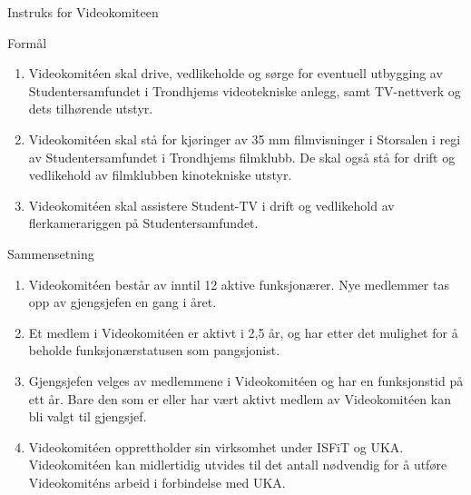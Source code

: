 \begin{instruks*}{Instruks for Videokomiteen}
    
    \begin{instruksledd}{Formål}
        \begin{enumerate}
            \item Videokomit\'een skal drive, vedlikeholde og sørge for eventuell
                utbygging av Studentersamfundet i
                Trondhjems videotekniske anlegg, samt TV-nettverk og dets tilhørende utstyr.
            \item Videokomit\'een skal stå for kjøringer av 35 mm filmvisninger i
                Storsalen i regi av Studentersamfundet i
                Trondhjems filmklubb. De skal også stå for drift og vedlikehold av filmklubben
                kinotekniske utstyr.
            \item Videokomit\'een skal assistere Student-TV i drift og vedlikehold av
                flerkamerariggen på Studentersamfundet.
        \end{enumerate}
    \end{instruksledd}

    \begin{instruksledd}{Sammensetning}
        \begin{enumerate}
            \item Videokomit\'een består av inntil 12 aktive funksjonærer. Nye medlemmer tas opp av
            gjengsjefen en gang i året.
            \item  Et medlem i Videokomit\'een er aktivt i 2,5 år, og har etter det mulighet for å
            beholde funksjonærstatusen som pangsjonist.
            \item Gjengsjefen velges av medlemmene i Videokomit\'een og har en funksjonstid på ett
            år. Bare den som er eller
            har vært aktivt medlem av Videokomit\'een kan bli valgt til gjengsjef.
            \item Videokomit\'een opprettholder sin virksomhet under ISFiT og UKA.
                Videokomit\'een kan midlertidig utvides
            til det antall nødvendig for å utføre Videokomit\'ens arbeid i forbindelse med UKA.
        \end{enumerate}
    \end{instruksledd}


\end{instruks*}
